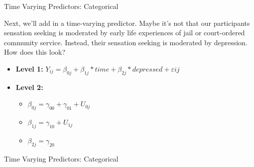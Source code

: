 \documentclass[ignorenonframetext,]{beamer}
\newenvironment{Shaded}{\begin{snugshade}}{\end{snugshade}}
\newcommand{\KeywordTok}[1]{\textcolor[rgb]{0.13,0.29,0.53}{\textbf{{#1}}}}
\newcommand{\DataTypeTok}[1]{\textcolor[rgb]{0.13,0.29,0.53}{{#1}}}
\newcommand{\DecValTok}[1]{\textcolor[rgb]{0.00,0.00,0.81}{{#1}}}
\newcommand{\FloatTok}[1]{\textcolor[rgb]{0.00,0.00,0.81}{{#1}}}
\newcommand{\StringTok}[1]{\textcolor[rgb]{0.31,0.60,0.02}{{#1}}}
\newcommand{\CommentTok}[1]{\textcolor[rgb]{0.56,0.35,0.01}{\textit{{#1}}}}
\newcommand{\NormalTok}[1]{{#1}}
\begin{document}
\begin{frame}{Time Varying Predictors: Categorical}

Next, we'll add in a time-varying predictor. Maybe it's not that our
participants sensation seeking is moderated by early life experiences of
jail or court-ordered community service. Instead, their sensation
seeking is moderated by depression.\\
How does this look?

\begin{itemize}
  \item \textbf{Level 1:} $Y_{ij} = \beta_{0j} + \beta_{1j}*time + \beta_{2j}*depressed + \varepsilon{ij}$
  \item \textbf{Level 2:} 
    \begin{itemize} 
      \item $\beta_{0j} = \gamma_{00} + \gamma_{01} + U_{0j}$
      \item $\beta_{1j} = \gamma_{10} + U_{1j}$
      \item $\beta_{2j} = \gamma_{20}$
    \end{itemize}
\end{itemize}

\end{frame}

\begin{frame}[fragile]{Time Varying Predictors: Categorical}

\small

\begin{Shaded}
\end{Shaded}

\end{frame}
\end{document}
